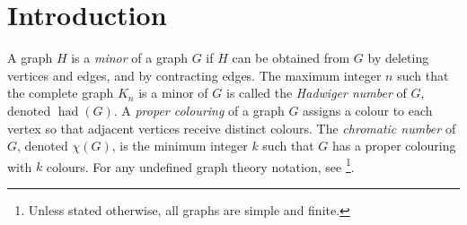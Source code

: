 \documentclass[11pt]{article}
\numberwithin{equation}{section}
\theoremstyle{plain}
\theoremstyle{definition}
\DeclareMathOperator{\had}{had}
\renewcommand{\thefootnote}{\fnsymbol{footnote}}
\newcommand{\defn}[1]{\textcolor{green!50!black}{\textit{#1}}}
\begin{document}
\renewcommand{\thefootnote}
{\arabic{footnote}}



\section{\boldmath Introduction}
\label{Introduction}
A graph $H$ is a \defn{minor} of a graph $G$ if $H$ can be obtained from $G$ by deleting vertices and edges, and by contracting edges. The maximum integer $n$ such that the complete graph $K_n$ is a minor of $G$ is called the \defn{Hadwiger number} of $G$, denoted \defn{$\had(G)$}. A \defn{proper colouring} of a graph $G$ assigns a colour to each vertex so that adjacent vertices receive distinct colours. The \defn{chromatic number} of $G$, denoted \defn{$\chi(G)$}, is the minimum integer $k$ such that $G$ has a proper colouring with $k$ colours. For any undefined graph theory notation, see \citet{Diestel05}\footnote{Unless stated otherwise, all graphs are simple and finite.}.
\end{document}
